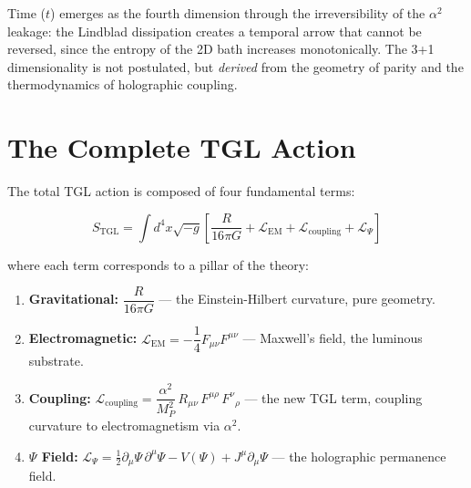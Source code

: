 \documentclass[12pt,a4paper,twoside]{article}
\newcommand{\alphaii}{\alpha^{2}}
\newcommand{\Psifield}{\Psi}
\begin{document}
Time ($t$) emerges as the fourth dimension through the irreversibility of the $\alphaii$ leakage: the Lindblad dissipation creates a temporal arrow that cannot be reversed, since the entropy of the 2D bath increases monotonically. The 3+1 dimensionality is not postulated, but \textit{derived} from the geometry of parity and the thermodynamics of holographic coupling.


\section{The Complete TGL Action}


The total TGL action is composed of four fundamental terms:

\begin{equationbox}[title={Complete TGL Action}]
\begin{equation}
S_{\text{TGL}} = \int d^4x \sqrt{-g}\left[\frac{R}{16\pi G} + \mathcal{L}_{\text{EM}} + \mathcal{L}_{\text{coupling}} + \mathcal{L}_\Psifield\right]
\label{eq:acao_completa}
\end{equation}
\end{equationbox}

\noindent where each term corresponds to a pillar of the theory:

\begin{enumerate}[nosep]
\item \textbf{Gravitational:} $\dfrac{R}{16\pi G}$ --- the Einstein-Hilbert curvature, pure geometry.

\item \textbf{Electromagnetic:} $\mathcal{L}_{\text{EM}} = -\dfrac{1}{4}F_{\mu\nu}F^{\mu\nu}$ --- Maxwell's field, the luminous substrate.

\item \textbf{Coupling:} $\mathcal{L}_{\text{coupling}} = \dfrac{\alphaii}{M_P^2}\,R_{\mu\nu}\,F^{\mu\rho}\,F^\nu{}_\rho$ --- the new TGL term, coupling curvature to electromagnetism via $\alphaii$.

\item \textbf{$\Psifield$ Field:} $\mathcal{L}_\Psifield = \frac{1}{2}\partial_\mu\Psifield\,\partial^\mu\Psifield - V(\Psifield) + J^\mu\partial_\mu\Psifield$ --- the holographic permanence field.
\end{enumerate}
\end{document}
